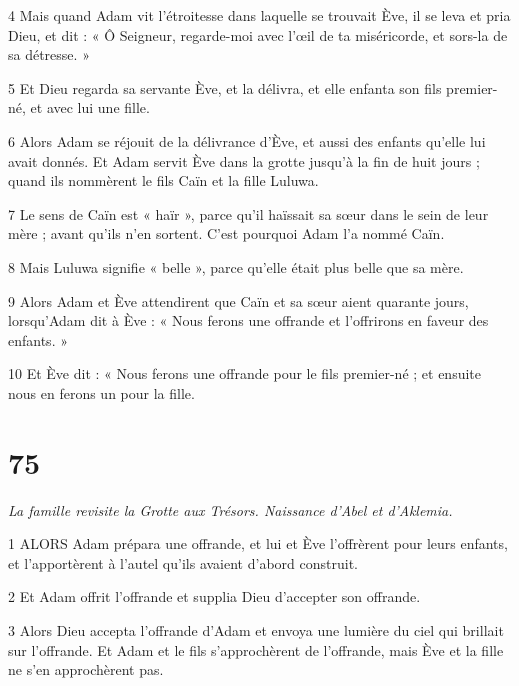 \par 4 Mais quand Adam vit l'étroitesse dans laquelle se trouvait Ève, il se leva et pria Dieu, et dit : « Ô Seigneur, regarde-moi avec l'œil de ta miséricorde, et sors-la de sa détresse. »

\par 5 Et Dieu regarda sa servante Ève, et la délivra, et elle enfanta son fils premier-né, et avec lui une fille.

\par 6 Alors Adam se réjouit de la délivrance d'Ève, et aussi des enfants qu'elle lui avait donnés. Et Adam servit Ève dans la grotte jusqu'à la fin de huit jours ; quand ils nommèrent le fils Caïn et la fille Luluwa.

\par 7 Le sens de Caïn est « haïr », parce qu'il haïssait sa sœur dans le sein de leur mère ; avant qu’ils n’en sortent. C’est pourquoi Adam l’a nommé Caïn.

\par 8 Mais Luluwa signifie « belle », parce qu'elle était plus belle que sa mère.

\par 9 Alors Adam et Ève attendirent que Caïn et sa sœur aient quarante jours, lorsqu'Adam dit à Ève : « Nous ferons une offrande et l'offrirons en faveur des enfants. »

\par 10 Et Ève dit : « Nous ferons une offrande pour le fils premier-né ; et ensuite nous en ferons un pour la fille.

\chapter{75}

\par \textit{La famille revisite la Grotte aux Trésors. Naissance d'Abel et d'Aklemia.}

\par 1 ALORS Adam prépara une offrande, et lui et Ève l'offrèrent pour leurs enfants, et l'apportèrent à l'autel qu'ils avaient d'abord construit.

\par 2 Et Adam offrit l'offrande et supplia Dieu d'accepter son offrande.

\par 3 Alors Dieu accepta l'offrande d'Adam et envoya une lumière du ciel qui brillait sur l'offrande. Et Adam et le fils s'approchèrent de l'offrande, mais Ève et la fille ne s'en approchèrent pas.

